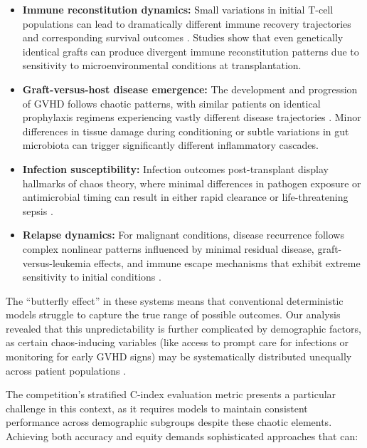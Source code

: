 \begin{itemize}
    \item \textbf{Immune reconstitution dynamics:} Small variations in initial T-cell populations can lead to dramatically different immune recovery trajectories and corresponding survival outcomes \cite{stmcls_clonality}. Studies show that even genetically identical grafts can produce divergent immune reconstitution patterns due to sensitivity to microenvironmental conditions at transplantation.
    
    \item \textbf{Graft-versus-host disease emergence:} The development and progression of GVHD follows chaotic patterns, with similar patients on identical prophylaxis regimens experiencing vastly different disease trajectories \cite{ash_chronic_gvhd}. Minor differences in tissue damage during conditioning or subtle variations in gut microbiota can trigger significantly different inflammatory cascades.
    
    \item \textbf{Infection susceptibility:} Infection outcomes post-transplant display hallmarks of chaos theory, where minimal differences in pathogen exposure or antimicrobial timing can result in either rapid clearance or life-threatening sepsis \cite{uptodate_hct}.
    
    \item \textbf{Relapse dynamics:} For malignant conditions, disease recurrence follows complex nonlinear patterns influenced by minimal residual disease, graft-versus-leukemia effects, and immune escape mechanisms that exhibit extreme sensitivity to initial conditions \cite{mdpi_cancers}.
\end{itemize}

The ``butterfly effect'' in these systems means that conventional deterministic models struggle to capture the true range of possible outcomes. Our analysis revealed that this unpredictability is further complicated by demographic factors, as certain chaos-inducing variables (like access to prompt care for infections or monitoring for early GVHD signs) may be systematically distributed unequally across patient populations \cite{jama_ai_medicine}.

The competition's stratified C-index evaluation metric \cite{kaggle_competition} presents a particular challenge in this context, as it requires models to maintain consistent performance across demographic subgroups despite these chaotic elements. Achieving both accuracy and equity demands sophisticated approaches that can:

